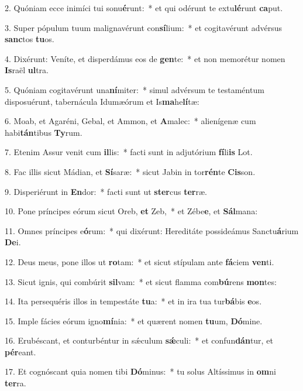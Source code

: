 2. Quóniam ecce inimíci tui sonu\textbf{é}runt:~*  et qui odérunt te extu\textbf{lé}runt \textbf{ca}put.\

3. Super pópulum tuum malignavérunt con\textbf{sí}lium:~*  et cogitavérunt advérsus \textbf{sanc}tos \textbf{tu}os.\

4. Dixérunt: Veníte, et disperdámus eos de \textbf{gen}te:~*  et non memorétur nomen \textbf{Is}raël \textbf{ul}tra.\

5. Quóniam cogitavérunt una\textbf{ní}miter:~*  simul advérsum te testaméntum disposuérunt, tabernácula Idumæórum et Is\textbf{ma}he\textbf{lí}tæ:\

6. Moab, et Agaréni, Gebal, et Ammon, et \textbf{A}malec:~*  alienígenæ cum habi\textbf{tán}tibus \textbf{Ty}rum.\

7. Etenim Assur venit cum \textbf{il}lis:~*  facti sunt in adjutórium \textbf{fí}li\textbf{is} Lot.\

8. Fac illis sicut Mádian, et \textbf{Sí}saræ:~*  sicut Jabin in tor\textbf{rén}te \textbf{Cis}son.\

9. Disperiérunt in \textbf{En}dor:~*  facti sunt ut \textbf{ster}cus \textbf{ter}ræ.\

10. Pone príncipes eórum sicut Oreb, \textbf{et} Zeb,~*  et Zébe\textbf{e}, et \textbf{Sál}mana:\

11. Omnes príncipes e\textbf{ó}rum:~*  qui dixérunt: Hereditáte possideámus Sanctu\textbf{á}rium \textbf{De}i.\

12. Deus meus, pone illos ut \textbf{ro}tam:~*  et sicut stípulam ante \textbf{fá}ciem \textbf{ven}ti.\

13. Sicut ignis, qui combúrit \textbf{sil}vam:~*  et sicut flamma com\textbf{bú}rens \textbf{mon}tes:\

14. Ita persequéris illos in tempestáte \textbf{tu}a:~*  et in ira tua tur\textbf{bá}bis \textbf{e}os.\

15. Imple fácies eórum igno\textbf{mí}nia:~*  et quærent nomen \textbf{tu}um, \textbf{Dó}mine.\

16. Erubéscant, et conturbéntur in sǽculum \textbf{sǽ}culi:~*  et confun\textbf{dán}tur, et \textbf{pér}eant.\

17. Et cognóscant quia nomen tibi \textbf{Dó}minus:~*  tu solus Altíssimus in \textbf{om}ni \textbf{ter}ra.\

